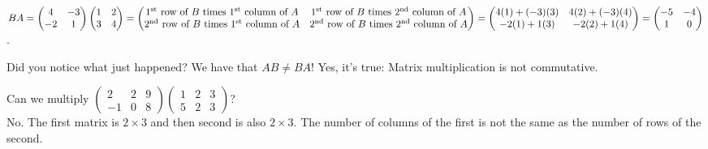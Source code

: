 \documentclass[12pt]{article}
\def\it{\item}
\begin{document}
$BA = \begin{pmatrix} 4 & -3 \\ -2 & 1 \end{pmatrix} \begin{pmatrix} 1 & 2 \\ 3 & 4 \end{pmatrix} = \\[.1in]
\begin{pmatrix} \mbox{$1^{\text{st}}$ row of $B$ times $1^{\text{st}}$ column of $A$} & \mbox{$1^{\text{st}}$ row of $B$ times $2^{\text{nd}}$ column of $A$} \\
\mbox{$2^{\text{nd}}$ row of $B$ times $1^{\text{st}}$ column of $A$} & \mbox{$2^{\text{nd}}$ row of $B$ times $2^{\text{nd}}$ column of $A$} \end{pmatrix} = \\[.1in]
\begin{pmatrix} 4(1)+(-3)(3) & 4(2)+(-3)(4) \\ -2(1)+1(3) & -2(2)+1(4) \end{pmatrix} = \begin{pmatrix} -5 & -4 \\ 1 & 0 \end{pmatrix}$.

Did you notice what just happened? We have that $AB \not= BA$! Yes, it's true: Matrix multiplication is not commutative.

\it Can we multiply $\begin{pmatrix} 2 & 2 & 9 \\ -1 & 0 & 8 \end{pmatrix} \begin{pmatrix} 1 & 2 & 3 \\ 5 & 2 & 3 \end{pmatrix}$? \\
No. The first matrix is $2 \times 3$ and then second is also $2 \times 3$. The number of columns of the first is not the same as the number of rows of the second.
\end{document}
